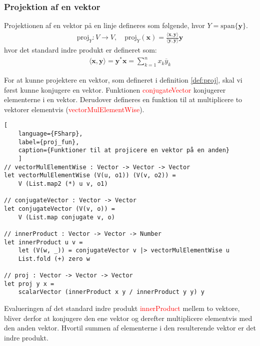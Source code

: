 \subsubsection{Projektion af en vektor}

\begin{definition}\label{def:proj}
Projektionen af en vektor på en linje defineres som følgende, hvor $Y = \text{span}\{\mathbf{y}\}$.
\begin{align*}
    \text{proj}_Y : V \rightarrow V, \quad \text{proj}_Y(\mathbf{x}) = \frac{\langle \mathbf{x}, \mathbf{y} \rangle}{\langle \mathbf{y}, \mathbf{y} \rangle} \mathbf{y}
\end{align*}
hvor det standard indre produkt er defineret som:
\begin{align*}
    \langle \mathbf{x}, \mathbf{y} \rangle = \mathbf{y}^* \mathbf{x} = \sum_{k=1}^{n} x_k \overline{y}_k
\end{align*}
\end{definition}

    

For at kunne projektere en vektor, som defineret i definition \ref{def:proj}, skal vi først kunne konjugere en vektor. Funktionen \textcolor{red}{conjugateVector} konjugerer elementerne i en vektor. Derudover defineres en funktion til at multiplicere to vektorer elementvis (\textcolor{red}{vectorMulElementWise}).

\begin{lstlisting}[
    language={FSharp}, 
    label={proj_fun}, 
    caption={Funktioner til at projicere en vektor på en anden}
    ]
// vectorMulElementWise : Vector -> Vector -> Vector
let vectorMulElementWise (V(u, o1)) (V(v, o2)) =
    V (List.map2 (*) u v, o1)

// conjugateVector : Vector -> Vector
let conjugateVector (V(v, o)) = 
    V (List.map conjugate v, o)

// innerProduct : Vector -> Vector -> Number
let innerProduct u v =
    let (V(w, _)) = conjugateVector v |> vectorMulElementWise u
    List.fold (+) zero w

// proj : Vector -> Vector -> Vector   
let proj y x =
    scalarVector (innerProduct x y / innerProduct y y) y
\end{lstlisting}

Evalueringen af det standard indre produkt \textcolor{red}{innerProduct} mellem to vektore, bliver derfor at konjugere den ene vektor og derefter multiplicere elementvis med den anden vektor. Hvortil summen af elementerne i den resulterende vektor er det indre produkt.

